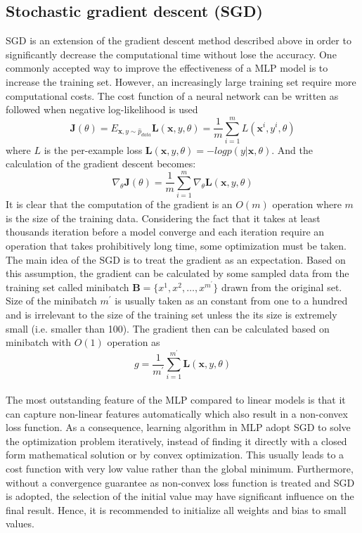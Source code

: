 \subsection{Stochastic gradient descent (SGD)}
SGD is an extension of the gradient descent method described above in order to significantly decrease the computational time without lose the accuracy.
One commonly accepted way to improve the effectiveness of a MLP model is to increase the training set.
However, an increasingly large training set require more computational costs.
The cost function of a neural network can be written as followed when negative log-likelihood is used
\begin{equation}
    \mathbf{J}(\theta) = E_{\mathbf{x},y\sim\hat{p}_{data}}\mathbf{L}(\mathbf{x},y,\theta)
    =\frac{1}{m}\sum^m_{i=1}L(\mathbf{x}^{i},y^{i},\theta)
\end{equation}
where $L$ is the per-example loss $\mathbf{L}(\mathbf{x},y,\theta)=-log p(y|\mathbf{x},\theta)$.
And the calculation of the gradient descent becomes:
\begin{equation}
    \nabla_{\theta} \mathbf{J}(\theta)
    =\frac{1}{m}\sum^m_{i=1}\nabla_\theta \mathbf{L} (\mathbf{x},y,\theta)
\end{equation}
It is clear that the computation of the gradient is an $O(m)$ operation where $m$ is the size of the training data.
Considering the fact that it takes at least thousands iteration before a model converge and each iteration require an operation that takes prohibitively long time, some optimization must be taken.
The main idea of the SGD is to treat the gradient as an expectation.
Based on this assumption, the gradient can be calculated by some sampled data from the training set called minibatch $\mathbf{B}=\{x^{1},x^{2},\dots,x^{m^\prime}\}$ drawn from the original set.
Size of the minibatch $m^\prime$ is usually taken as an constant from one to a hundred and is irrelevant to the size of the training set unless the its size is extremely small (i.e. smaller than 100).
The gradient then can be calculated based on minibatch with $O(1)$ operation as
\begin{equation}
    g
    =\frac{1}{m^\prime} \sum^{m^\prime}_{i=1} \mathbf{L} (\mathbf{x},y,\theta)
\end{equation}

\paragraph{}
The most outstanding feature of the MLP compared to linear models is that it can capture non-linear features automatically which also result in a non-convex loss function.
As a consequence, learning algorithm in MLP adopt SGD to solve the optimization problem iteratively, instead of finding it directly with a closed form mathematical solution or by convex optimization.
This usually leads to a cost function with very low value rather than the global minimum.
Furthermore, without a convergence guarantee as non-convex loss function is treated and SGD is adopted, the selection of the initial value may have significant influence on the final result.
Hence, it is recommended to initialize all weights and bias to small values.

